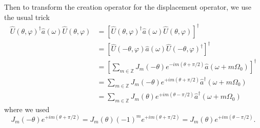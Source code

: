 Then to transform the creation operator for the displacement operator, we use the usual trick
\begin{equation}
	\begin{split}
		\hat{U}(\theta,\varphi)^\dagger
		\hat{a}(\omega)
		\hat{U}(\theta,\varphi)
		&=
		\left[
			\hat{U}(\theta,\varphi)^\dagger
			\hat{a}(\omega)
			\hat{U}(\theta,\varphi)	
		\right]^\dagger
		\\
		&=
		\left[
			\hat{U}(-\theta,\varphi)
			\hat{a}(\omega)
			\hat{U}(-\theta,\varphi)^\dagger	
		\right]^\dagger
		\\
		&=
		\left[
			\sum_{m\in\mathbb{Z}}
			J_m(-\theta)
			e^{-im(\theta+\pi/2)}
			\hat{a}(\omega+m\Omega_0)
		\right]^\dagger
		\\
		&=
		\sum_{m\in\mathbb{Z}}
		J_m(-\theta)
		e^{+im(\theta+\pi/2)}
		\hat{a}^\dagger(\omega+m\Omega_0)
		\\
		&=
		\sum_{m\in\mathbb{Z}}
		J_m(\theta)
		e^{+im(\theta-\pi/2)}
		\hat{a}^\dagger(\omega+m\Omega_0)
	\end{split}
\end{equation}
where we used
\begin{equation}
	J_m(-\theta)
	e^{+im(\theta+\pi/2)}
	=
	J_m(\theta)
	(-1)^m
	e^{+im(\theta+\pi/2)}
	=
	J_m(\theta)
	e^{+im(\theta-\pi/2)}
	.
\end{equation}

